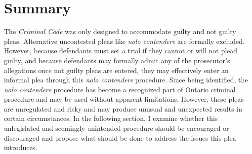 \section{Summary}

The \textit{Criminal Code} was only designed to accommodate guilty and not guilty pleas. Alternative uncontested pleas like \textit{nolo contendere} are formally excluded. However, because defendants must set a trial if they cannot or will not plead guilty, and because defendants may formally admit any of the prosecutor's allegations once not guilty pleas are entered, they may effectively enter an informal plea through this \textit{nolo contendere} procedure. Since being identified, the \textit{nolo contendere} procedure has become a recognized part of Ontario criminal procedure and may be used without apparent limitations. However, these pleas are unregulated and risky and may produce unusual and unexpected results in certain circumstances. In the following section, I examine whether this unlegislated and seemingly unintended procedure should be encouraged or discouraged and propose what should be done to address the issues this plea introduces.